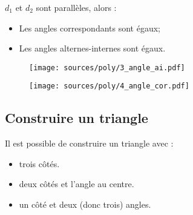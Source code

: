 \documentclass[paper=a4, fontsize=9pt]{scrartcl} %
\begin{document}
\begin{multicols}{3}

 \begin{Proposition}{$d_1$ et $d_2$ sont parallèles, alors :}\\
\begin{itemize}
    \item Les angles correspondants sont égaux;
    \item Les angles alternes-internes sont égaux.
\end{itemize}
  \end{Proposition}

\begin{figure}[H]
  \centering
  \texttt{[image: sources/poly/3\_angle\_ai.pdf]}
\end{figure}


\begin{figure}[H]
  \centering
  \texttt{[image: sources/poly/4\_angle\_cor.pdf]}
\end{figure}

\end{multicols}

\subsection{Construire un triangle}

Il est possible de construire un triangle avec :

\begin{itemize}
\item trois côtés.
\item deux côtés et l'angle au centre.
\item un côté et deux (donc trois) angles.
\end{itemize}
\end{document}
